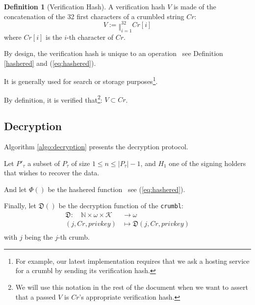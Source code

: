 \documentclass[twoside,twocolumn]{article}
\theoremstyle{definition}
\newtheorem{definition}{Definition}
\theoremstyle{remark}
\begin{document}
\begin{definition}[Verification Hash]
    \label{verificationHash}
    A verification hash $V$ is made of the concatenation of the 32 first characters of a crumbled string $Cr$:
    \begin{equation}
        \label{eq:verificationHash}
        V := \mathbin\Vert_{i=1}^{32} Cr[i]
    \end{equation}
    where $Cr[i]$ is the $i$-th character of $Cr$.

    By design, the verification hash is unique to an operation \textemdash~see Definition \ref{hashered} and (\ref{eq:hashered}).

    It is generally used for search or storage purposes\footnote{For example, our latest implementation requires that we ask a hosting service for a 
    crumbl by sending its verification hash.}.

    By definition, it is verified that\footnote{We will use this notation in the rest of the document when we want to assert that a passed $V$ is $Cr$'s 
    appropriate verification hash.}: $V \subset Cr$.
\end{definition}

\subsection{Decryption}

Algorithm \ref{algo:decryption} presents the decryption protocol.

\vspace{1em} %

Let $P'_\tau$ a subset of $P_\tau$ of size $1 \leq n \leq |P_\tau| - 1$, and $H_1$ one of the signing holders that wishes to recover the data.

And let $\Phi()$ be the hashered function \textemdash~see (\ref{eq:hashered}).

Finally, let $\mathfrak{D}()$ be the decryption function of the \texttt{crumbl}:
\begin{equation}
    \label{eq:decrypt}
    \begin{array}{rl}
        \mathfrak{D}: \quad \mathbb{N} \times \omega \times \mathcal{K} &\to \omega \\
                (j, Cr, privkey) &\mapsto \mathfrak{D}(j, Cr, privkey) \\
    \end{array}
\end{equation}
with $j$ being the $j$-th crumb.
\end{document}
